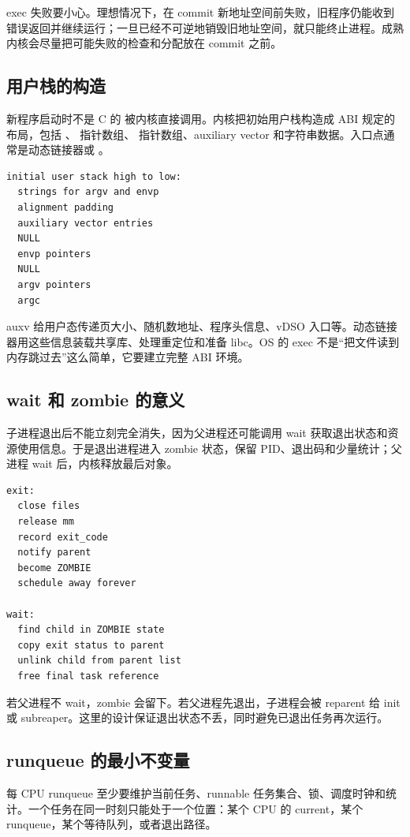 exec 失败要小心。理想情况下，在 commit 新地址空间前失败，旧程序仍能收到错误返回并继续运行；一旦已经不可逆地销毁旧地址空间，就只能终止进程。成熟内核会尽量把可能失败的检查和分配放在 commit 之前。

\subsection{用户栈的构造}

新程序启动时不是 C 的  被内核直接调用。内核把初始用户栈构造成 ABI 规定的布局，包括 、 指针数组、 指针数组、auxiliary vector 和字符串数据。入口点通常是动态链接器或 。

\begin{lstlisting}
initial user stack high to low:
  strings for argv and envp
  alignment padding
  auxiliary vector entries
  NULL
  envp pointers
  NULL
  argv pointers
  argc
\end{lstlisting}

auxv 给用户态传递页大小、随机数地址、程序头信息、vDSO 入口等。动态链接器用这些信息装载共享库、处理重定位和准备 libc。OS 的 exec 不是“把文件读到内存跳过去”这么简单，它要建立完整 ABI 环境。

\subsection{wait 和 zombie 的意义}

子进程退出后不能立刻完全消失，因为父进程还可能调用 wait 获取退出状态和资源使用信息。于是退出进程进入 zombie 状态，保留 PID、退出码和少量统计；父进程 wait 后，内核释放最后对象。

\begin{lstlisting}
exit:
  close files
  release mm
  record exit_code
  notify parent
  become ZOMBIE
  schedule away forever

wait:
  find child in ZOMBIE state
  copy exit status to parent
  unlink child from parent list
  free final task reference
\end{lstlisting}

若父进程不 wait，zombie 会留下。若父进程先退出，子进程会被 reparent 给 init 或 subreaper。这里的设计保证退出状态不丢，同时避免已退出任务再次运行。

\subsection{runqueue 的最小不变量}

每 CPU runqueue 至少要维护当前任务、runnable 任务集合、锁、调度时钟和统计。一个任务在同一时刻只能处于一个位置：某个 CPU 的 current，某个 runqueue，某个等待队列，或者退出路径。

